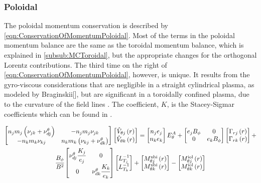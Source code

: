\subsubsection{Poloidal} \label{subsub:MCPoloidal}

The poloidal momentum conservation is described by \cref{eqn:ConservationOfMomentumPoloidal}. Most of the terms in the poloidal momentum balance are the same as the toroidal momentum balance, which is explained in \cref{subsub:MCToroidal}, but the appropriate changes for the orthogonal Lorentz contributions. The third time on the right of \cref{eqn:ConservationOfMomentumPoloidal}, however, is unique. It results from the gyro-viscous considerations that are negligible in a straight cylindrical plasma, as modeled by Braginskii[\cite{Braginskii1965}], but are significant in a toroidally confined plasma, due to the curvature of the field lines \cite{Stacey2020}. The coefficient, $K$, is the Stacey-Sigmar coefficients which can be found in  \cite{StaceySigmar1985}.

\begin{multline} \label{eqn:ConservationOfMomentumPoloidal}
	\begin{bmatrix}
		n_j m_j \left( \nu_{jk} + \nu^{\theta}_{dj} \right) & -n_j m_j \nu_{jk} \\
		-n_k m_k \nu_{kj}  & n_k m_k \left( \nu_{kj}+\nu^{\theta}_{dk} \right)
	\end{bmatrix}
	\begin{bmatrix}
		\hat{V}_{\theta j}\left(r\right) \\
		\hat{V}_{\theta k}\left(r\right)								
	\end{bmatrix} =
	\begin{bmatrix}
		n_j e_j \\
		n_k e_k
	\end{bmatrix} E^A_{\theta} +
	\begin{bmatrix}
		e_j B_\phi & 0 \\
		0            & e_k B_\phi
	\end{bmatrix}
	\begin{bmatrix}
		\Gamma_{rj} \left(r\right) \\
		\Gamma_{rk} \left(r\right)
	\end{bmatrix} + \\
	\cfrac{B_{\phi}}{B^2}
	\begin{bmatrix}
		\nu^\theta_{dj} \cfrac{K_j}{e_j} & 0 \\
		0 & \nu^\theta_{dk} \cfrac{K_k}{e_k}
	\end{bmatrix}
	\begin{bmatrix}
		L^{-1}_{T_j} \\
		L^{-1}_{T_k}
	\end{bmatrix} +
	\begin{bmatrix}
		M_{\theta j}^\mathrm{nbi}\left(r\right) \\
		M_{\theta k}^\mathrm{nbi}\left(r\right)
	\end{bmatrix} -
	\begin{bmatrix}
		M_{\theta j}^\mathrm{iol}\left(r\right) \\
		M_{\theta k}^\mathrm{iol}\left(r\right)
	\end{bmatrix}
\end{multline}
